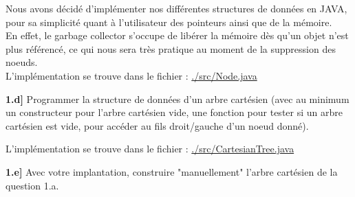 \documentclass[a4paper,12pt]{report}
\begin{document}
\begin{tcolorbox}[colback=gray!10, colframe=blue!30, coltitle=black, title=Réponse à la 1.c - 1/1]

    Nous avons décidé d'implémenter nos différentes structures de données en JAVA, pour sa simplicité quant à l'utilisateur des pointeurs ainsi que de la mémoire.\\

    En effet, le garbage collector s'occupe de libérer la mémoire dès qu'un objet n'est plus référencé, ce qui nous sera très pratique au moment de la suppression des noeuds.\\

    L'implémentation se trouve dans le fichier : \href{./src/Node.java}{./src/Node.java}

\end{tcolorbox}




\vspace{1.5cm}

\textbf{1.d]} Programmer la structure de données d'un arbre cartésien (avec au minimum un constructeur pour l'arbre cartésien vide, une fonction pour tester si un arbre cartésien est vide, pour accéder au fils droit/gauche d'un noeud donné).

\begin{tcolorbox}[colback=gray!10, colframe=blue!30, coltitle=black, title=Réponse à la 1.d - 1/1]

    L'implémentation se trouve dans le fichier : \href{./src/CartesianTree.java}{./src/CartesianTree.java}

\end{tcolorbox}




\vspace{1.5cm}

\textbf{1.e]} Avec votre implantation, construire "manuellement" l'arbre cartésien de la question 1.a.
\end{document}
